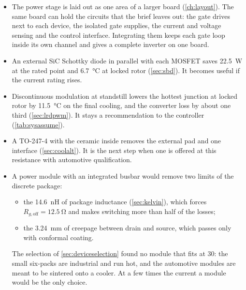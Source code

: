 \begin{itemize}
  \item The power stage is laid out as one area of a larger board
        (\cref{ch:layout}). The same board can hold the circuits that the
        brief leaves out: the gate drives next to each device, the isolated
        gate supplies, the current and voltage sensing and the control
        interface. Integrating them keeps each gate loop inside its own
        channel and gives a complete inverter on one board.
  \item An external SiC Schottky diode in parallel with each MOSFET saves
        \SI{22.5}{\watt} at the rated point and \SI{6.7}{\celsius} at locked
        rotor (\cref{sec:sbd}). It becomes useful if the current rating rises.
  \item Discontinuous modulation at standstill lowers the hottest junction
        at locked rotor by \SI{11.5}{\celsius} on the final cooling, and the
        converter loss by about one third (\cref{sec:lrdpwm}). It stays a
        recommendation to the controller (\cref{tab:sysassume}).
  \item A TO-247-4 with the ceramic inside removes the external pad and one
        interface (\cref{sec:coolalt}). It is the next step when one is
        offered at this resistance with automotive qualification.
  \item A power module with an integrated busbar would remove two limits of
        the discrete package:
        \begin{itemize}
          \item the \SI{14.6}{\nano\henry} of package inductance
                (\cref{sec:kelvin}), which forces
                $R_{g,\mathrm{off}} = \SI{12.5}{\ohm}$ and makes switching
                more than half of the losses;
          \item the \SI{3.24}{\milli\metre} of creepage between drain and
                source, which passes only with conformal coating.
        \end{itemize}
        The selection of \cref{sec:deviceselection} found no module that
        fits at \SI{30}{\Arms}: the small six-packs are industrial and run
        hot, and the automotive modules are meant to be sintered onto a
        cooler. At a few times the current a module would be the only choice.
\end{itemize}
